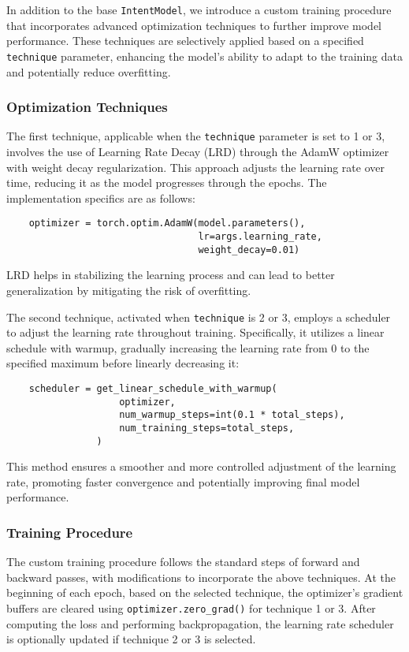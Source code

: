 In addition to the base \texttt{IntentModel}, we introduce a custom training procedure that incorporates advanced optimization techniques to further improve model performance. These techniques are selectively applied based on a specified \texttt{technique} parameter, enhancing the model's ability to adapt to the training data and potentially reduce overfitting.

\subsubsection*{Optimization Techniques}

The first technique, applicable when the \texttt{technique} parameter is set to 1 or 3, involves the use of Learning Rate Decay (LRD) through the AdamW optimizer with weight decay regularization. This approach adjusts the learning rate over time, reducing it as the model progresses through the epochs. The implementation specifics are as follows:
\begin{verbatim}
    optimizer = torch.optim.AdamW(model.parameters(), 
                                  lr=args.learning_rate, 
                                  weight_decay=0.01)
\end{verbatim}
LRD helps in stabilizing the learning process and can lead to better generalization by mitigating the risk of overfitting.

The second technique, activated when \texttt{technique} is 2 or 3, employs a scheduler to adjust the learning rate throughout training. Specifically, it utilizes a linear schedule with warmup, gradually increasing the learning rate from 0 to the specified maximum before linearly decreasing it:
\begin{verbatim}
    scheduler = get_linear_schedule_with_warmup(
                    optimizer,
                    num_warmup_steps=int(0.1 * total_steps),
                    num_training_steps=total_steps,
                )
\end{verbatim}
This method ensures a smoother and more controlled adjustment of the learning rate, promoting faster convergence and potentially improving final model performance.

\subsubsection*{Training Procedure}
The custom training procedure follows the standard steps of forward and backward passes, with modifications to incorporate the above techniques. At the beginning of each epoch, based on the selected technique, the optimizer's gradient buffers are cleared using \texttt{optimizer.zero\_grad()} for technique 1 or 3. After computing the loss and performing backpropagation, the learning rate scheduler is optionally updated if technique 2 or 3 is selected.


